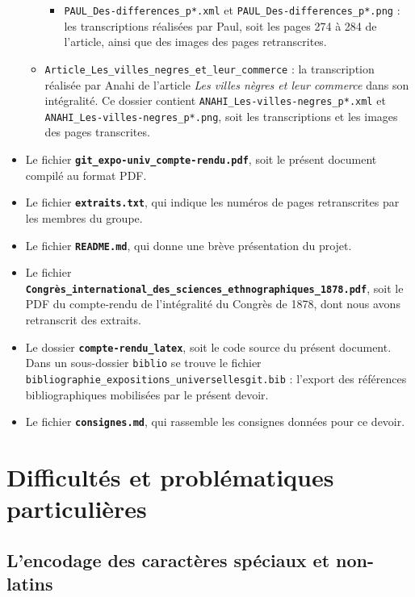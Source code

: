 \documentclass{article}
\begin{document}
\begin{itemize}
\begin{itemize}
\begin{itemize}
				\item 		\texttt{PAUL\_Des-differences\_p*.xml} et \texttt{PAUL\_Des-differences\_p*.png} : les transcriptions réalisées par Paul, soit les pages 274 à 284 de l'article, ainsi que des images des pages retranscrites.
			\end{itemize}
			\item \texttt{Article\_Les\_villes\_negres\_et\_leur\_commerce} : la transcription réalisée par Anahi de l'article \textit{Les villes nègres et leur commerce} dans son intégralité. Ce dossier contient \texttt{ANAHI\_Les-villes-negres\_p*.xml} et \texttt{ANAHI\_Les-villes-negres\_p*.png}, soit les transcriptions et les images des pages transcrites.
		\end{itemize}
		\item Le fichier \textbf{\texttt{git\_expo-univ\_compte-rendu.pdf}}, soit le présent document compilé au format PDF.
		\item Le fichier \textbf{\texttt{extraits.txt}}, qui indique les numéros de pages retranscrites par les membres du groupe.
		\item Le fichier \textbf{\texttt{README.md}}, qui donne une brève présentation du projet.
		\item Le fichier \textbf{\texttt{Congrès\_international\_des\_sciences\_ethnographiques\_1878.pdf}}, soit le PDF du compte-rendu de l'intégralité du Congrès de 1878, dont nous avons retranscrit des extraits.
		\item Le dossier \textbf{\texttt{compte-rendu\_latex}}, soit le code source du présent document. Dans un sous-dossier \texttt{biblio} se trouve le fichier \texttt{bibliographie\_expositions\_universellesgit.bib} : l'export des références bibliographiques mobilisées par le présent devoir.
		\item Le fichier \textbf{\texttt{consignes.md}}, qui rassemble les consignes données pour ce devoir.
	\end{itemize}
	
	
	\section{Difficultés et problématiques particulières}
	
	
	
	\subsection{L'encodage des caractères spéciaux et non-latins}
	
\end{document}
